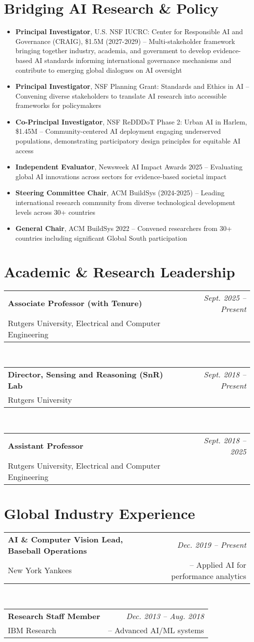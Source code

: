 \documentclass[11pt,letterpaper]{article}
\makeatletter
\newcommand{\profentry}[4]{
    \begin{tabularx}{\textwidth}{@{}X r@{}}
        \textbf{\color{darkGray}#1} & \textcolor{mediumGray}{\textit{#2}} \\
        \textcolor{mediumGray}{#3} & #4
    \end{tabularx}
}
\newcommand{\listentry}[1]{
    \item[\textcolor{accentBlue}{\small\faAngleRight}] #1
}
\makeatother
\begin{document}
\section{Bridging AI Research \& Policy}
\begin{itemize}
\listentry{\textbf{\color{UNBlue}Principal Investigator}, U.S. NSF IUCRC: Center for Responsible AI and Governance (CRAIG), \$1.5M (2027-2029) -- Multi-stakeholder framework bringing together industry, academia, and government to develop evidence-based AI standards informing international governance mechanisms and contribute to emerging global dialogues on AI oversight}
\listentry{\textbf{\color{UNBlue}Principal Investigator}, NSF Planning Grant: Standards and Ethics in AI -- Convening diverse stakeholders to translate AI research into accessible frameworks for policymakers}
\listentry{\textbf{\color{UNBlue}Co-Principal Investigator}, NSF ReDDDoT Phase 2: Urban AI in Harlem, \$1.45M -- Community-centered AI deployment engaging underserved populations, demonstrating participatory design principles for equitable AI access}
\listentry{\textbf{\color{UNBlue}Independent Evaluator}, Newsweek AI Impact Awards 2025 -- Evaluating global AI innovations across sectors for evidence-based societal impact}
\listentry{\textbf{\color{UNBlue}Steering Committee Chair}, ACM BuildSys (2024-2025) -- Leading international research community from diverse technological development levels across 30+ countries}
\listentry{\textbf{\color{UNBlue}General Chair}, ACM BuildSys 2022 -- Convened researchers from 30+ countries including significant Global South participation}
\end{itemize}

\section{Academic \& Research Leadership}
\profentry{Associate Professor (with Tenure)}{Sept. 2025 -- Present}{Rutgers University, Electrical and Computer Engineering}{}\\[2pt]
\profentry{Director, Sensing and Reasoning (SnR) Lab}{Sept. 2018 -- Present}{Rutgers University}{}\\[2pt]
\profentry{Assistant Professor}{Sept. 2018 -- 2025}{Rutgers University, Electrical and Computer Engineering}{}

\section{Global Industry Experience}
\profentry{AI \& Computer Vision Lead, Baseball Operations}{Dec. 2019 -- Present}{New York Yankees}{-- Applied AI for performance analytics}\\[2pt]
\profentry{Research Staff Member}{Dec. 2013 -- Aug. 2018}{IBM Research}{-- Advanced AI/ML systems}
\end{document}
